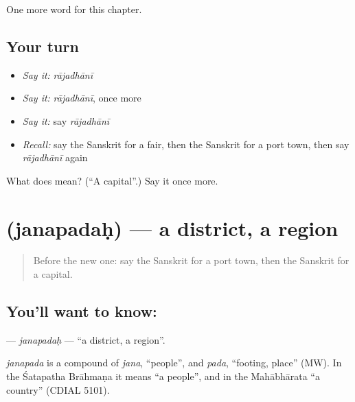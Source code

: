 \begin{grammarlens}[title={What you've built}]
One more word for this chapter.
\end{grammarlens}

\subsection*{Your turn}
\begin{itemize}
\raggedright
  \item \emph{Say it:} \emph{rājadhānī}
  \item \emph{Say it:} \emph{rājadhānī}, once more
  \item \emph{Say it:} say \emph{rājadhānī}
  \item \emph{Recall:} say the Sanskrit for a fair, then the Sanskrit for a port town, then say \emph{rājadhānī} again
\end{itemize}

\begin{tcolorbox}[breakable,colback=teal!4,colframe=teal!35!black,title={Before you move on}]
What does  mean? (\textquotedblleft{}A capital\textquotedblright{}.) Say it once more.
\end{tcolorbox}
\section[\texorpdfstring{\sk{जनपदः} (janapadaḥ)}{जनपदः (janapadaḥ)}]{ (janapadaḥ) — a district, a region}

\label{lesson:SA-C195-janapadah}



\begin{quote}
Before the new one: say the Sanskrit for a port town, then the Sanskrit for a capital.
\end{quote}

\subsection*{You'll want to know: }
\textbf{} — \emph{janapadaḥ} — \textquotedblleft{}a district, a region\textquotedblright{}.

\begin{cousinweb}
\emph{janapada} is a compound of \emph{jana}, \textquotedblleft{}people\textquotedblright{}, and \emph{pada}, \textquotedblleft{}footing, place\textquotedblright{} (MW). In the Śatapatha Brāhmaṇa it means \textquotedblleft{}a people\textquotedblright{}, and in the Mahābhārata \textquotedblleft{}a country\textquotedblright{} (CDIAL 5101).
\end{cousinweb}

